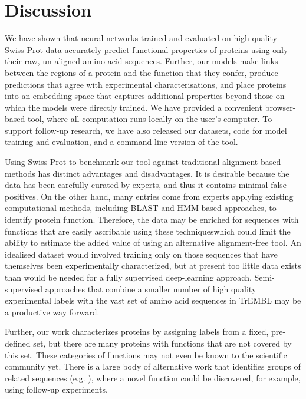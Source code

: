 \DIFaddend \section*{Discussion}

We have shown that neural networks trained and evaluated on high-quality Swiss-Prot data accurately predict functional properties of proteins using only their raw, un-aligned amino acid sequences. Further, our models make links between the regions of a protein and the function that they confer, produce predictions that agree with experimental characterisations, and place proteins into an embedding space that captures additional properties beyond those on which the models were directly trained. We have provided a convenient browser-based tool, where all computation runs locally on the user's computer. To support follow-up research, we have also released our datasets, code for model training and evaluation, and a command-line version of the tool.

Using Swiss-Prot to benchmark our tool against traditional alignment-based methods has distinct advantages and disadvantages. It is desirable because the data has been carefully curated by experts, and thus it contains minimal false-positives. On the other hand, many entries come from experts applying existing computational methods, including BLAST and HMM-based approaches, to identify protein function. Therefore, the data may be enriched for sequences with functions that are easily ascribable using these techniqueswhich could limit the ability to estimate the added value of using an alternative alignment-free tool. An idealised dataset would involved training only on those sequences that have themselves been experimentally characterized, but at present  too little data exists than would be needed for a fully supervised deep-learning approach. Semi-supervised approaches that combine a smaller number of high quality experimental labels with the vast set of amino acid sequences in TrEMBL may be a productive way forward.

Further, our work characterizes proteins by assigning labels from a fixed, pre-defined set, but there are many proteins with functions that are not covered by this set. These categories of functions may not even be known to the scientific community yet. There is a large body of alternative work that identifies groups of related sequences (e.g. \cite{pmid12952885}), where a novel function could be discovered, for example, using follow-up experiments.

